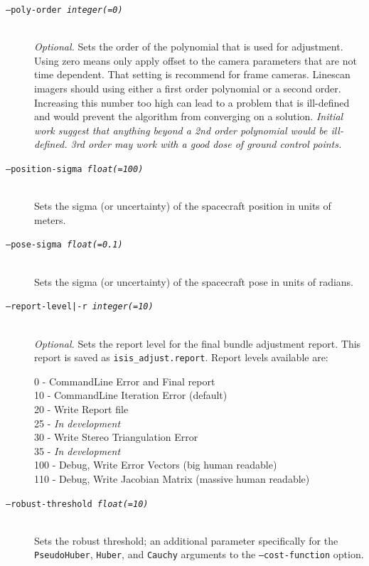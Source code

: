 \begin{description}
\item[\texttt{--poly-order \textit{integer(=0)}}] \hfill \\
  \emph{Optional.} Sets the order of the polynomial that is used for
  adjustment. Using zero means only apply offset to the camera
  parameters that are not time dependent. That setting is recommend
  for frame cameras. Linescan imagers should using either a first
  order polynomial or a second order. Increasing this number too high can
  lead to a problem that is ill-defined and would prevent the algorithm 
	from converging on a solution. \emph{Initial work suggest that anything
    beyond a 2nd order polynomial would be ill-defined. 3rd order may
    work with a good dose of ground control points.}

\item[\texttt{--position-sigma \textit{float(=100)}}] \hfill \\
  Sets the sigma (or uncertainty) of the spacecraft position in
  units of meters.

\item[\texttt{--pose-sigma \textit{float(=0.1)}}] \hfill \\
  Sets the sigma (or uncertainty) of the spacecraft pose in units
  of radians.

\item[\texttt{--report-level|-r \textit{integer(=10)}}] \hfill \\
  \emph{Optional.} Sets the report level for the final bundle
  adjustment report.  This report is saved as
  \texttt{isis\_adjust.report}. Report levels available are:

  \begin{description}
    \item[0   - CommandLine Error and Final report]
    \item[10  - CommandLine Iteration Error (default)]
    \item[20  - Write Report file]
    \item[25  - \textnormal{\emph{In development}}]
    \item[30  - Write Stereo Triangulation Error]
    \item[35  - \textnormal{\emph{In development}}]
    \item[100 - Debug, Write Error Vectors (big human readable)]
    \item[110 - Debug, Write Jacobian Matrix (massive human readable)]
  \end{description}

\item[\texttt{--robust-threshold \textit{float(=10)}}] \hfill \\
  Sets the robust threshold; an additional parameter specifically for
  the \texttt{PseudoHuber}, \texttt{Huber}, and \texttt{Cauchy} arguments to the   \texttt{--cost-function} option.


\end{description}
